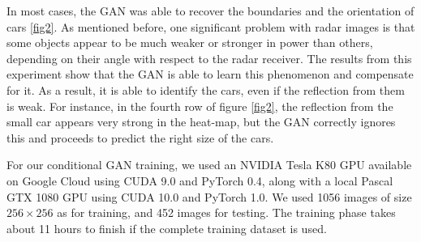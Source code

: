 In most cases, the GAN was able to recover the boundaries and the orientation of cars \ref{fig2}. As mentioned before, one significant problem with radar images is that some objects appear to be much weaker or stronger in power than others, depending on their angle with respect to the radar receiver. The results from this experiment show that the GAN is able to learn this phenomenon and compensate for it. As a result, it is able to identify the cars, even if the reflection from them is weak. For instance, in the fourth row of figure \ref{fig2}, the reflection from the small car appears very strong in the heat-map, but the GAN correctly ignores this and proceeds to predict the right size of the cars.  

For our conditional GAN training, we used an NVIDIA Tesla K80 GPU available on Google Cloud using CUDA 9.0 and PyTorch 0.4, along with a local Pascal GTX 1080 GPU using CUDA 10.0 and PyTorch 1.0. We used 1056 images of size $256 \times 256$ as for training, and 452 images for testing. The training phase takes about 11 hours to finish if the complete training dataset is used.